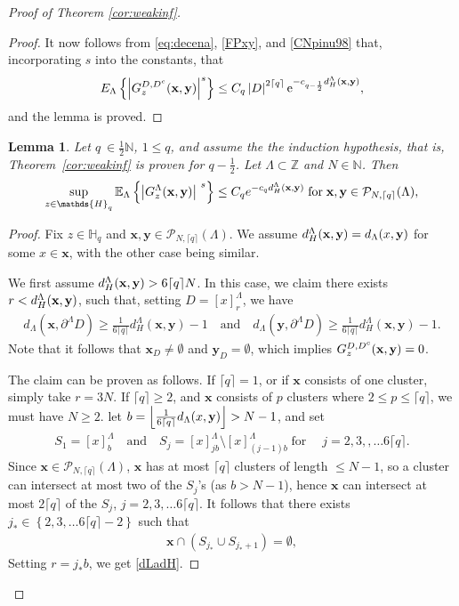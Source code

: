 \documentclass[12pt, a4paper,reqno]{amsart}
\numberwithin{equation}{section}
\newtheorem{lemma}[theorem]{Lemma}
\newcommand\N{\mathbb N}
\newcommand\Z{\mathbb Z}
\newcommand\x{\mathbf{x}}
\newcommand\y{\mathbf{y}}
\newcommand\e{\mathrm{e}}
\newcommand\E{\mathbb E}
\newcommand\cP{\mathcal{P}}
\newcommand\be{\begin{equation}\begin{aligned}}
\newcommand\ee{\end{aligned}\end{equation}}
\newcommand{\abs}[1]{\left\lvert #1 \right\rvert}
\newcommand{\set}[1]{\left\{ #1 \right\}}
\newcommand{\pa}[1]{\left( #1 \right)}
\newcommand{\fl}[1]{\left\lfloor #1 \right\rfloor}
\newcommand{\cl}[1]{\lceil #1 \rceil}
\newcommand\La{\Lambda}
\newcommand{\eq}[1]{\eqref{#1}}
\newcommand{\qtx}[1]{\quad\text{#1}\quad}
\newcommand{\sqtx}[1]{\;\text{#1}\;}
\begin{document}
\begin{proof}[Proof of  Theorem \ref{cor:weakinf}]
\begin{proof}
It now follows from \eq{eq:decena}, \eq{FPxy}, and \eq{CNpinu98} that, incorporating $s$ into the constants,
that
\be
E_\La\set{ \abs{G^{D,D^c}_{z}({\bf x},{\bf y})}^s} \le  C_{ q}\abs{D}^{2\cl{q}} \e^{-c_{q-\frac12} { d_H^\La ({\bf x},{\bf y})} },
\ee
and the lemma is proved.     
\end{proof}






\begin{lemma}\label{lem:spr}
Let $q\ \in  \frac 12 \N$, $1\le q $, and   assume the the induction hypothesis,  that is,  Theorem~\ref{cor:weakinf} is proven for $q-\frac 12$. 
Let  $\La \subset \Z$ and  $N\in \N$.  Then
\be\label{eq:spr}
\sup_{z\in\mathds{H}_q}\E_{\La}\set{\abs{G_z^\La ({\bf x},{\bf y}) }^{\ s}}\le C_q e^{-c_q d_H^\La(\x,\y)} \sqtx{for}\x,\y\in \cP_{N,\cl{q}}(\La),
\ee
\end{lemma}


\begin{proof}






Fix  $z\in\mathds{H}_q$ and $\x,\y\in \cP_{N,\cl{q}}(\La)$. We assume $d_H^\La ({\bf x},{\bf y})=  d_\La (x, {\bf y})$ for some $x\in \x$, with the other case being similar.


  We first assume $d_H^\La ({\bf x},{\bf y})>6\cl{q}N$.    In this case, we claim there exists $ r <d_H^\La ({\bf x},{\bf y})$, such that, setting 
 $D=[x]^\La_r $,   we have 
 \be\label{dLadH}
 d_\La (\x, \partial^\La D )\ge  \tfrac 1 {6\cl{q}} d_H^\La(\x,\y)-1 \qtx{and} d_\La (\y, \partial^\La D)\ge  \tfrac 1 {6\cl{q}} d_H^\La(\x,\y)-1. 
 \ee
Note that it follows that  $ \x_D \ne \emptyset$ and $\y_D=\emptyset$, which implies  $G_z^{D,D^c} ({\bf x},{\bf y})=0$.

 
The claim can be proven as follows. If $\cl{q}=1$,  or if $\x$ consists of one cluster, simply take $r= 3N$.  If  $\cl{q}\ge 2$, and   $\x$ consists of  $p$ clusters  where $2\le p \le \cl{q}$,  we must have  $N\ge 2$.
let  $b=\fl{\tfrac 1 {6\cl{q}}  d_\La (x, {\bf y})}>N-1$, and set 
 \be
 S_1=  [x]^\La_{b} \qtx{and} S_j=  [x]^\La_{jb}\setminus  [x]^\La_{(j-1) b } \sqtx{for} \quad j=2,3,,\ldots 6\cl{q}.
 \ee
 Since $\x\in \cP_{N,\cl{q}}(\La)$, $\x$ has at most $\cl{q}$ clusters of length $\le N-1$, so a cluster  can intersect at most two of the $S_{j}$'s (as $ b> N-1$), hence $\x $ can intersect at most $2\cl{q}$ of the $S_{j}$,  $j=2,3,\ldots 6\cl{q}$. It follows that there exists 
  ${j}_* \in \set{2,3,\ldots 6\cl{q}-2}$ such that 
 \be\label{eq:M}
 \x\cap \pa{S_{{j}_*}\cup S_{{j}_*+1}}=\emptyset,
 \ee  
Setting $r= {{j}_*}b$, we get \eq{dLadH}.



\end{proof}
\end{proof}
\end{document}
